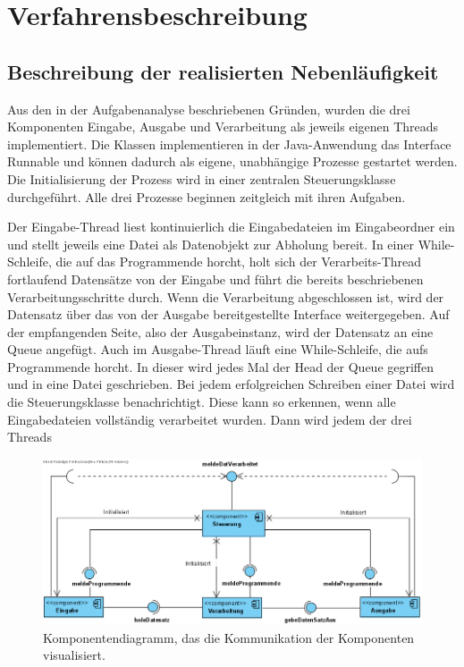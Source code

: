 \chapter{Verfahrensbeschreibung}\label{ch:verfahrensbeschreibung}

\section{Beschreibung der realisierten Nebenläufigkeit}\label{sec:nebenl}
Aus den in der Aufgabenanalyse beschriebenen Gründen, wurden die drei Komponenten Eingabe, Ausgabe und Verarbeitung als jeweils eigenen Threads implementiert.
Die Klassen implementieren in der Java-Anwendung das Interface Runnable und können dadurch als eigene, unabhängige Prozesse gestartet werden.
Die Initialisierung der Prozess wird in einer zentralen Steuerungsklasse durchgeführt.
Alle drei Prozesse beginnen zeitgleich mit ihren Aufgaben.

Der Eingabe-Thread liest kontinuierlich die Eingabedateien im Eingabeordner ein und stellt jeweils eine Datei als Datenobjekt zur Abholung bereit.
In einer While-Schleife, die auf das Programmende horcht, holt sich der Verarbeits-Thread fortlaufend Datensätze von der Eingabe und führt die bereits beschriebenen Verarbeitungsschritte durch.
Wenn die Verarbeitung abgeschlossen ist, wird der Datensatz über das von der Ausgabe bereitgestellte Interface weitergegeben.
Auf der empfangenden Seite, also der Ausgabeinstanz, wird der Datensatz an eine Queue angefügt.
Auch im Ausgabe-Thread läuft eine While-Schleife, die aufs Programmende horcht.
In dieser wird jedes Mal der Head der Queue gegriffen und in eine Datei geschrieben.
Bei jedem erfolgreichen Schreiben einer Datei wird die Steuerungsklasse benachrichtigt.
Diese kann so erkennen, wenn alle Eingabedateien vollständig verarbeitet wurden.
Dann wird jedem der drei Threads


\begin{figure}[htb]
    \centering
    \includegraphics[width=\linewidth]{images/ComponentDiagram1}
    \caption{
        Komponentendiagramm, das die Kommunikation der Komponenten visualisiert.
    }
    \label{fig:komoponent}
\end{figure}


